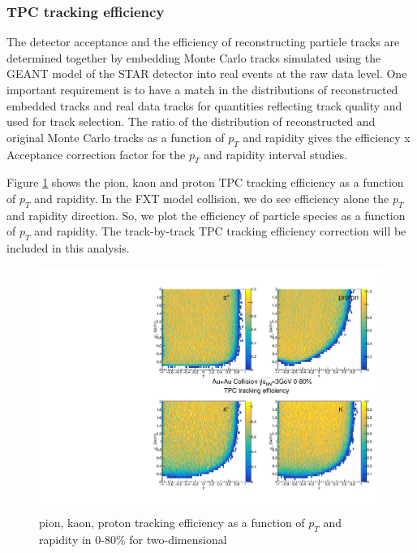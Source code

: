 \subsubsection{TPC tracking efficiency}

The detector acceptance and the efficiency of reconstructing particle tracks are determined together by embedding Monte Carlo tracks simulated using the GEANT model \cite{Agostinelli:2002hh} of the STAR detector into real events at the raw data level. One important requirement is to have a match in the distributions of reconstructed embedded tracks and real data tracks for quantities reflecting track quality and used for track selection. The ratio of the distribution of reconstructed and original Monte Carlo tracks as a function of $p_{T}$ and rapidity gives the efficiency x Acceptance correction factor for the $p_{T}$ and rapidity interval studies. 
	
Figure \ref{fig:pikp_eff_tpc} shows the pion, kaon and proton TPC tracking efficiency as a function of $p_{T}$ and rapidity. In the FXT model collision, we do see efficiency alone the $p_{T}$ and rapidity direction. So, we plot the efficiency of particle species as a function of $p_{T}$ and rapidity. The track-by-track TPC tracking efficiency correction will be included in this analysis.

\begin{figure}
    \centering
    \includegraphics[scale=0.5]{FXT3gev/chapter2/fig/eff/pik_tpceff.pdf}
    \caption{pion, kaon, proton tracking efficiency as a function of $p_{T}$ and rapidity in 0-80\% for two-dimensional}
    \label{fig:pikp_eff_tpc}
\end{figure}
	
